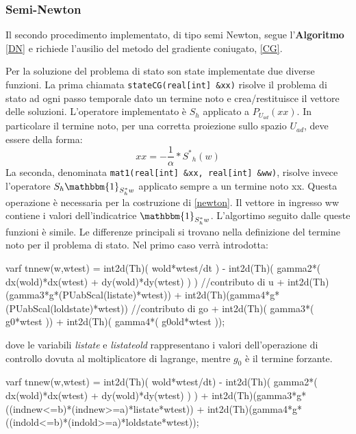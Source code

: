 \subsubsection{Semi-Newton}
Il secondo procedimento implementato, di tipo semi Newton, segue l'\textbf{Algoritmo} \ref{DN} e richiede l'ausilio del metodo del gradiente coniugato, \ref{CG}.
\par
Per la soluzione del problema di stato son state implementate due diverse funzioni. La prima chiamata \texttt{stateCG(real[int] \&xx)} risolve il problema di stato ad ogni passo temporale dato un termine noto e crea/restituisce il vettore delle soluzioni. L'operatore implementato è $S_h$ applicato a $P_{U_{ad}}(xx)$.
In particolare il termine noto, per una corretta proiezione sullo spazio $U_{ad}$, deve essere della forma:
\begin{equation}
xx = -\frac{1}{\alpha}*{S^{*}}_{h}(w)
\end{equation}
La seconda, denominata \texttt{mat1(real[int] \&xx, real[int] \&ww)}, risolve invece l'operatore $S_h\mathbbm{1}_{S^*_hw}$ applicato sempre a un termine noto xx. Questa operazione è necessaria per la costruzione di \eqref{newton}. Il vettore in ingresso ww contiene i valori dell'indicatrice $\mathbbm{1}_{S^*_hw}$.
L'algortimo seguito dalle queste funzioni è simile. Le differenze principali si trovano nella definizione del termine noto per il problema di stato. Nel primo caso verrà introdotta:
\begin{Code}[caption={Matrice \texttt{tnnew(w,wtest)} per \texttt{stateCG(real[int] \&xx)}}]
varf tnnew(w,wtest) =   int2d(Th)( wold*wtest/dt )
				  	  - int2d(Th)( gamma2*( dx(wold)*dx(wtest) + dy(wold)*dy(wtest) ) )
						//contributo di u
					  + int2d(Th)(gamma3*g*(PUabScal(listate)*wtest))
					  + int2d(Th)(gamma4*g*(PUabScal(loldstate)*wtest)) 
						//contributo di go 
					  + int2d(Th)( gamma3*( g0*wtest ))
			 		  + int2d(Th)( gamma4*( g0old*wtest ));
\end{Code}
dove le variabili \textit{listate} e \textit{listateold} rappresentano i valori dell'operazione di controllo dovuta al moltiplicatore di lagrange, mentre $g_0$ è il termine forzante.
\begin{Code}[caption={Matrice \texttt{tnnew(w,wtest)} per \texttt{mat1(real[int] \&xx, real[int] \&ww)}}]
varf tnnew(w,wtest) =  int2d(Th)( wold*wtest/dt) 
	  				 - int2d(Th)( gamma2*( dx(wold)*dx(wtest) + dy(wold)*dy(wtest) ) ) 
				     + int2d(Th)(gamma3*g*((indnew<=b)*(indnew>=a)*listate*wtest))
					 + int2d(Th)(gamma4*g*((indold<=b)*(indold>=a)*loldstate*wtest));
\end{Code}
